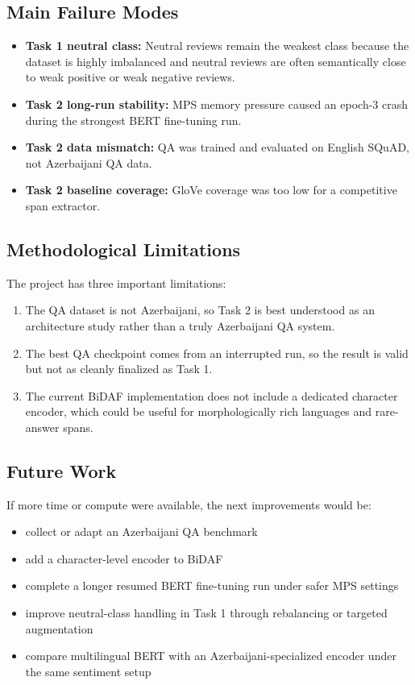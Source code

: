 \documentclass[11pt]{article}
\begin{document}
\subsection{Main Failure Modes}
\begin{itemize}
    \item \textbf{Task 1 neutral class:} Neutral reviews remain the weakest class because the dataset is highly imbalanced and neutral reviews are often semantically close to weak positive or weak negative reviews.
    \item \textbf{Task 2 long-run stability:} MPS memory pressure caused an epoch-3 crash during the strongest BERT fine-tuning run.
    \item \textbf{Task 2 data mismatch:} QA was trained and evaluated on English SQuAD, not Azerbaijani QA data.
    \item \textbf{Task 2 baseline coverage:} GloVe coverage was too low for a competitive span extractor.
\end{itemize}

\subsection{Methodological Limitations}
The project has three important limitations:
\begin{enumerate}
    \item The QA dataset is not Azerbaijani, so Task 2 is best understood as an architecture study rather than a truly Azerbaijani QA system.
    \item The best QA checkpoint comes from an interrupted run, so the result is valid but not as cleanly finalized as Task 1.
    \item The current BiDAF implementation does not include a dedicated character encoder, which could be useful for morphologically rich languages and rare-answer spans.
\end{enumerate}

\subsection{Future Work}
If more time or compute were available, the next improvements would be:
\begin{itemize}
    \item collect or adapt an Azerbaijani QA benchmark
    \item add a character-level encoder to BiDAF
    \item complete a longer resumed BERT fine-tuning run under safer MPS settings
    \item improve neutral-class handling in Task 1 through rebalancing or targeted augmentation
    \item compare multilingual BERT with an Azerbaijani-specialized encoder under the same sentiment setup
\end{itemize}
\end{document}
